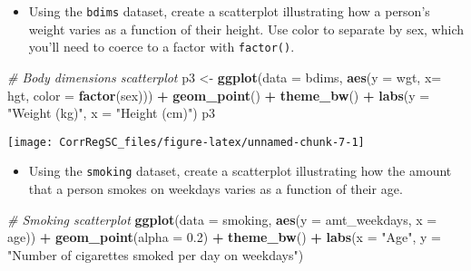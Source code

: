\documentclass[
]{book}
\newenvironment{Shaded}{\begin{snugshade}}{\end{snugshade}}
\newcommand{\CommentTok}[1]{\textcolor[rgb]{0.56,0.35,0.01}{\textit{#1}}}
\newcommand{\DataTypeTok}[1]{\textcolor[rgb]{0.13,0.29,0.53}{#1}}
\newcommand{\FloatTok}[1]{\textcolor[rgb]{0.00,0.00,0.81}{#1}}
\newcommand{\KeywordTok}[1]{\textcolor[rgb]{0.13,0.29,0.53}{\textbf{#1}}}
\newcommand{\NormalTok}[1]{#1}
\newcommand{\OperatorTok}[1]{\textcolor[rgb]{0.81,0.36,0.00}{\textbf{#1}}}
\newcommand{\StringTok}[1]{\textcolor[rgb]{0.31,0.60,0.02}{#1}}
\providecommand{\tightlist}{%
  \setlength{\itemsep}{0pt}\setlength{\parskip}{0pt}}
\begin{document}
\begin{itemize}
\tightlist
\item
  Using the \texttt{bdims} dataset, create a scatterplot illustrating how a person's weight varies as a function of their height. Use color to separate by sex, which you'll need to coerce to a factor with \texttt{factor()}.
\end{itemize}

\begin{Shaded}
\begin{Highlighting}[]
\CommentTok{# Body dimensions scatterplot}
\NormalTok{p3 <-}\StringTok{ }\KeywordTok{ggplot}\NormalTok{(}\DataTypeTok{data =}\NormalTok{ bdims, }\KeywordTok{aes}\NormalTok{(}\DataTypeTok{y =}\NormalTok{ wgt, }\DataTypeTok{x=}\NormalTok{ hgt, }\DataTypeTok{color =} \KeywordTok{factor}\NormalTok{(sex))) }\OperatorTok{+}\StringTok{ }
\StringTok{  }\KeywordTok{geom_point}\NormalTok{() }\OperatorTok{+}\StringTok{ }
\StringTok{  }\KeywordTok{theme_bw}\NormalTok{() }\OperatorTok{+}\StringTok{ }
\StringTok{  }\KeywordTok{labs}\NormalTok{(}\DataTypeTok{y =} \StringTok{"Weight (kg)"}\NormalTok{, }\DataTypeTok{x =} \StringTok{"Height (cm)"}\NormalTok{)}
\NormalTok{p3}
\end{Highlighting}
\end{Shaded}

\begin{center}\texttt{[image: CorrRegSC\_files/figure-latex/unnamed-chunk-7-1]} \end{center}

\begin{itemize}
\tightlist
\item
  Using the \texttt{smoking} dataset, create a scatterplot illustrating how the amount that a person smokes on weekdays varies as a function of their age.
\end{itemize}

\begin{Shaded}
\begin{Highlighting}[]
\CommentTok{# Smoking scatterplot}
\KeywordTok{ggplot}\NormalTok{(}\DataTypeTok{data =}\NormalTok{ smoking, }\KeywordTok{aes}\NormalTok{(}\DataTypeTok{y =}\NormalTok{ amt_weekdays, }\DataTypeTok{x =}\NormalTok{ age)) }\OperatorTok{+}\StringTok{ }
\StringTok{  }\KeywordTok{geom_point}\NormalTok{(}\DataTypeTok{alpha =} \FloatTok{0.2}\NormalTok{) }\OperatorTok{+}\StringTok{ }
\StringTok{  }\KeywordTok{theme_bw}\NormalTok{() }\OperatorTok{+}\StringTok{ }
\StringTok{  }\KeywordTok{labs}\NormalTok{(}\DataTypeTok{x =} \StringTok{"Age"}\NormalTok{, }\DataTypeTok{y =} \StringTok{"Number of cigarettes smoked per day on weekdays"}\NormalTok{)}
\end{Highlighting}
\end{Shaded}
\end{document}

